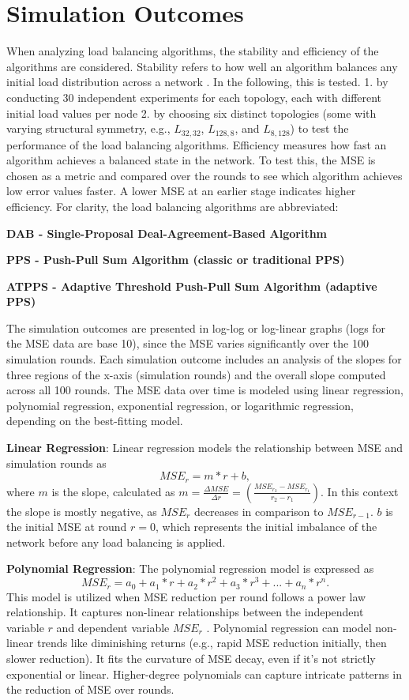 \chapter{Simulation Outcomes}\label{chap:simulationoutcomes}
When analyzing load balancing algorithms, the stability and efficiency of the algorithms are considered. Stability refers to how well an algorithm balances any initial load distribution across a network \cite{ChengzhongFrancis}. In the following, this is tested. 1. by conducting 30 independent experiments for each topology, each with different initial load values per node 2. by choosing six distinct topologies (some with varying structural symmetry, e.g., $L_{32,32}$, $L_{128,8}$, and $L_{8,128}$) to test the performance of the load balancing algorithms. Efficiency measures how fast an algorithm achieves a balanced state in the network. To test this, the MSE is chosen as a metric and compared over the rounds to see which algorithm achieves low error values faster. A lower MSE at an earlier stage indicates higher efficiency. For clarity, the load balancing algorithms are abbreviated:

\textbf{DAB - Single-Proposal Deal-Agreement-Based Algorithm}

\textbf{PPS - Push-Pull Sum Algorithm (classic or traditional PPS)}

\textbf{ATPPS - Adaptive Threshold Push-Pull Sum Algorithm (adaptive PPS)}

The simulation outcomes are presented in log-log or log-linear graphs (logs for the MSE data are base 10), since the MSE varies significantly over the 100 simulation rounds. Each simulation outcome includes an analysis of the slopes for three regions of the x-axis (simulation rounds) and the overall slope computed across all 100 rounds. The MSE data over time is modeled using linear regression, polynomial regression, exponential regression, or logarithmic regression, depending on the best-fitting model.

\textbf{Linear Regression}: Linear regression models the relationship between MSE and simulation rounds as $$MSE_r=m*r+b,$$ where $m$ is the slope, calculated as $m=\frac{\Delta MSE}{\Delta r}=(\frac{MSE_{r_2}-MSE_{r_1}}{r_2 - r_1})$. In this context the slope is mostly negative, as $MSE_r$ decreases in comparison to $MSE_{r-1}$. $b$ is the initial MSE at round $r=0$, which represents the initial imbalance of the network before any load balancing is applied.

\textbf{Polynomial Regression}: The polynomial regression model is expressed as $$MSE_r=a_0+a_1*r+a_2*r^{2}+a_3*r^{3}+...+a_n*r^{n}.$$ This model is utilized when MSE reduction per round follows a power law relationship. It captures non-linear relationships between the independent variable $r$ and dependent variable $MSE_r$ \cite{MotulskyDataFitting}. Polynomial regression can model non-linear trends like diminishing returns (e.g., rapid MSE reduction initially, then slower reduction). It fits the curvature of MSE decay, even if it's not strictly exponential or linear. Higher-degree polynomials can capture intricate patterns in the reduction of MSE over rounds.

